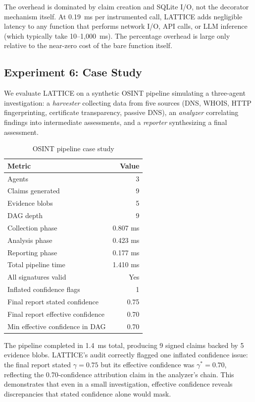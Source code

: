 \documentclass[11pt,twocolumn]{article}
\begin{document}
The overhead is dominated by claim creation and SQLite I/O, not the decorator mechanism itself. At 0.19~ms per instrumented call, LATTICE adds negligible latency to any function that performs network I/O, API calls, or LLM inference (which typically take 10--1{,}000~ms). The percentage overhead is large only relative to the near-zero cost of the bare function itself.

\subsection{Experiment 6: Case Study}

We evaluate LATTICE on a synthetic OSINT pipeline simulating a three-agent investigation: a \textit{harvester} collecting data from five sources (DNS, WHOIS, HTTP fingerprinting, certificate transparency, passive DNS), an \textit{analyzer} correlating findings into intermediate assessments, and a \textit{reporter} synthesizing a final assessment.

\begin{table}[H]
\centering
\caption{OSINT pipeline case study}
\label{tab:casestudy}
\begin{tabular}{@{}lr@{}}
\toprule
\textbf{Metric} & \textbf{Value} \\
\midrule
Agents & 3 \\
Claims generated & 9 \\
Evidence blobs & 5 \\
DAG depth & 9 \\
Collection phase & 0.807 ms \\
Analysis phase & 0.423 ms \\
Reporting phase & 0.177 ms \\
Total pipeline time & 1.410 ms \\
\midrule
All signatures valid & Yes \\
Inflated confidence flags & 1 \\
Final report stated confidence & 0.75 \\
Final report effective confidence & 0.70 \\
Min effective confidence in DAG & 0.70 \\
\bottomrule
\end{tabular}
\end{table}

The pipeline completed in 1.4~ms total, producing 9 signed claims backed by 5 evidence blobs. LATTICE's audit correctly flagged one inflated confidence issue: the final report stated $\gamma = 0.75$ but its effective confidence was $\gamma^* = 0.70$, reflecting the 0.70-confidence attribution claim in the analyzer's chain. This demonstrates that even in a small investigation, effective confidence reveals discrepancies that stated confidence alone would mask.
\end{document}
